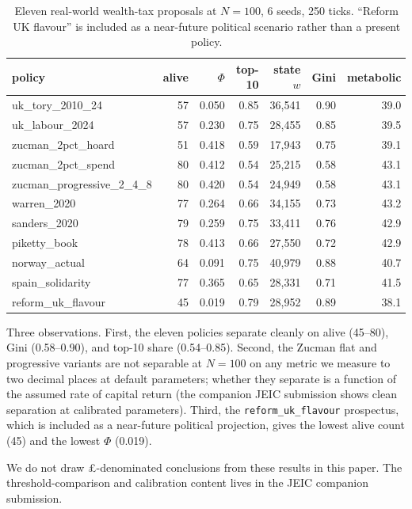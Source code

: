 \documentclass[11pt]{article}
\begin{document}
\begin{table}[t]
\centering
\small
\caption{Eleven real-world wealth-tax proposals at $N=100$, 6 seeds,
250 ticks.  ``Reform UK flavour'' is included as a near-future
political scenario rather than a present policy.}
\label{tab:policies-100}
\begin{tabular}{lrrrrrr}
\toprule
policy & alive & $\Phi$ & top-10 & state $w$ & Gini & metabolic \\
\midrule
uk\_tory\_2010\_24            & 57 & 0.050 & 0.85 & 36{,}541 & 0.90 & 39.0 \\
uk\_labour\_2024              & 57 & 0.230 & 0.75 & 28{,}455 & 0.85 & 39.5 \\
zucman\_2pct\_hoard           & 51 & 0.418 & 0.59 & 17{,}943 & 0.75 & 39.1 \\
zucman\_2pct\_spend           & 80 & 0.412 & 0.54 & 25{,}215 & 0.58 & 43.1 \\
zucman\_progressive\_2\_4\_8 & 80 & 0.420 & 0.54 & 24{,}949 & 0.58 & 43.1 \\
warren\_2020                  & 77 & 0.264 & 0.66 & 34{,}155 & 0.73 & 43.2 \\
sanders\_2020                 & 79 & 0.259 & 0.75 & 33{,}411 & 0.76 & 42.9 \\
piketty\_book                 & 78 & 0.413 & 0.66 & 27{,}550 & 0.72 & 42.9 \\
norway\_actual                & 64 & 0.091 & 0.75 & 40{,}979 & 0.88 & 40.7 \\
spain\_solidarity             & 77 & 0.365 & 0.65 & 28{,}331 & 0.71 & 41.5 \\
reform\_uk\_flavour           & 45 & 0.019 & 0.79 & 28{,}952 & 0.89 & 38.1 \\
\bottomrule
\end{tabular}
\end{table}

Three observations.  First, the eleven policies separate cleanly on
alive (45--80), Gini (0.58--0.90), and top-10 share (0.54--0.85).
Second, the Zucman flat and progressive variants are not separable
at $N=100$ on any metric we measure to two decimal places at default
parameters; whether they separate is a function of the assumed rate
of capital return (the companion JEIC submission shows clean
separation at calibrated parameters).  Third, the
\texttt{reform\_uk\_flavour} prospectus, which is included as a
near-future political projection, gives the lowest alive count (45)
and the lowest $\Phi$ (0.019).

We do not draw \pounds-denominated conclusions from these results in
this paper.  The threshold-comparison and calibration content lives
in the JEIC companion submission.
\end{document}

